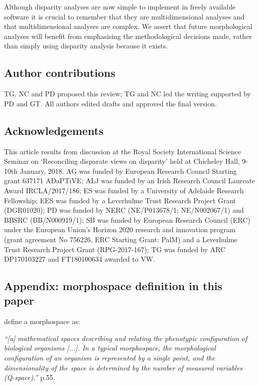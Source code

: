 \documentclass[12pt,letterpaper]{article}
\begin{document}
Although disparity analyses are now simple to implement in freely available software \citep{Bouxin2005, oksanen2007vegan, Harmon2008, lloyd2016, Guillerme2018b} it is crucial to remember that they are multidimensional analyses and that multidimensional analyses are complex.
We assert that future morphological analyses will benefit from emphasising the methodological decisions made, rather than simply using disparity analysis because it exists.

\subsection{Author contributions}

TG, NC and PD proposed this review; TG and NC led the writing supported by PD and GT. All authors edited drafts and approved the final version.

\subsection{Acknowledgements}

This article results from discussion at the Royal Society International Science Seminar on `Reconciling disparate views on disparity' held at Chicheley Hall, 9-10th January, 2018.
AG was funded by European Research Council Starting grant 637171 ADaPTiVE;
ALJ was funded by an Irish Research Council Laureate Award IRCLA/2017/186;
ES was funded by a University of Adelaide Research Fellowship;
EES was funded by a Leverhulme Trust Research Project Grant (DGR01020);
PD was funded by NERC (NE/P013678/1; NE/N002067/1) and BBSRC (BB/N000919/1);
SB was funded by European Research Council (ERC) under the European Union's Horizon 2020 research and innovation program (grant agreement No 756226, ERC Starting Grant: PalM) and a Leverhulme Trust Research Project Grant (RPG-2017-167);
TG was funded by ARC DP170103227 and FT180100634 awarded to VW.


\subsection{Appendix: morphospace definition in this paper} \label{section:appendixmorphospace}

\noindent \cite{mitteroecker2009concept} define a morphospace as:

\setlength{\leftskip}{1cm}
\setlength{\rightskip}{1cm}

\noindent \textit{``[a] mathematical spaces describing and relating the phenotypic configuration of biological organisms [...]. In a typical morphospace, the morphological configuration of an organism is represented by a single point, and the dimensionality of the space is determined by the number of measured variables (Q-space).''} \citealt{mitteroecker2009concept} p.55.
\end{document}
